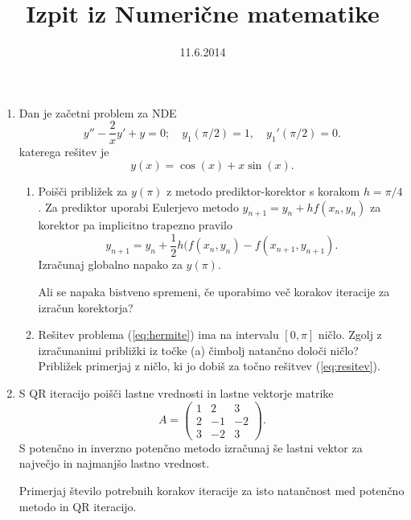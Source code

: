 \documentclass[slovene]{article}
\begin{document}
\title{Izpit iz Numerične matematike}


\date{11.6.2014}
\maketitle
\begin{enumerate}
\item Dan je začetni problem za NDE  
\begin{equation}
y''-\frac{2}{x}y'+y=0;\quad y_{1}(\pi/2)=1,\quad y_{1}'(\pi/2)=0.\label{eq:hermite}
\end{equation}
katerega rešitev je 
\begin{equation}
y(x)=\cos(x)+x\sin(x).\label{eq:resitev}
\end{equation} 
\begin{enumerate}
\item Poišči približek za $y(\pi)$ z metodo prediktor-korektor s korakom $h=\pi/4$.
Za prediktor uporabi Eulerjevo metodo $y_{n+1}=y_n +hf(x_n,y_n)$ za korektor pa 
implicitno trapezno pravilo
\begin{equation*}
y_{n+1}=y_n +\frac{1}{2}h(f(x_n,y_n)-f(x_{n+1},y_{n+1}).
\end{equation*}
Izračunaj globalno napako za $y(\pi)$.  

Ali se napaka bistveno spremeni, če uporabimo več korakov iteracije 
za izračun korektorja?
\item
Rešitev problema (\ref{eq:hermite}) ima na intervalu $[0,\pi]$ ničlo. 
Zgolj z izračunanimi približki iz točke (a) čimbolj natančno določi 
ničlo? Približek primerjaj z ničlo, ki jo dobiš za točno rešitvev 
(\ref{eq:resitev}).    
\end{enumerate}

\item S QR iteracijo poišči lastne vrednosti in lastne vektorje matrike
  \begin{equation}
    \label{eq:matrika}
    A= \begin{pmatrix}
      1 & 2 & 3\\
      2 & -1 & -2\\
      3 & -2 & 3
    \end{pmatrix}.
  \end{equation}
S potenčno in inverzno potenčno metodo izračunaj še lastni vektor za 
največjo in najmanjšo lastno vrednost.

Primerjaj število potrebnih korakov iteracije za isto 
natančnost med potenčno metodo in QR iteracijo. 
 \end{enumerate}
\end{document}
